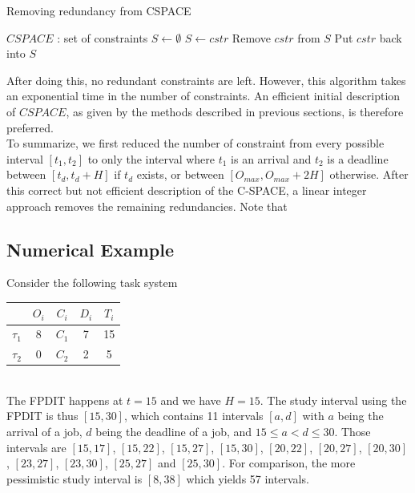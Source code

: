 \documentclass[times, 10pt,twocolumn, a4paper]{article}
\begin{document}
\begin{algorithm}
\caption{Removing redundancy from CSPACE}
\label{alg:prunRedun}
	\begin{algorithmic}[1]
		\STATE $CSPACE$ : set of constraints
		\STATE $S \leftarrow \emptyset$
		\STATE {}
				\STATE $S \leftarrow cstr$
			\ENDIF
		\ENDFOR
		\STATE {}
			\STATE Remove $cstr$ from $S$
				\STATE Put $cstr$ back into $S$
			\ENDIF
		\ENDFOR
	\end{algorithmic}
\end{algorithm}

After doing this, no redundant constraints are left. However, this algorithm takes an exponential time in the number of constraints. An efficient initial description of $CSPACE$, as given by the methods described in previous sections, is therefore preferred.\\

To summarize, we first reduced the number of constraint from every possible interval $[t_1, t_2]$ to only the interval where $t_1$ is an arrival and $t_2$ is a deadline between $[t_d, t_d + H]$ if $t_d$ exists, or between $[O_{max}, O_{max} + 2H]$ otherwise. After this correct but not efficient description of the C-SPACE, a linear integer approach removes the remaining redundancies. Note that

\subsection{Numerical Example}

Consider the following task system

		\begin{center}
		\begin{tabular}{|r|c|c|c|c|}
		 \hline
		  & $O_i$ & $C_i$ & $D_i$ & $T_i$ \\
		 \hline
		 $\tau_1$ & 8 & $C_1$ & 7 & 15\\
		 \hline
		 $\tau_2$ & 0 & $C_2$ & 2 & 5\\
		 \hline
		\end{tabular}
		\end{center}
		~\\

The FPDIT happens at $t=15$ and we have $H = 15$. The study interval using the FPDIT is thus $[15, 30]$, which contains 11 intervals $[a,d]$ with $a$ being the arrival of a job, $d$ being the deadline of a job, and $15 \leqslant a < d \leqslant 30$. Those intervals are
$[15, 17]$, $[15, 22]$, $[15, 27]$, $[15, 30]$, $[20, 22]$, $[20, 27]$, $[20, 30]$, $[23, 27]$, $[23, 30]$, $[25, 27]$ and $[25, 30]$. For comparison, the more pessimistic study interval is $[8, 38]$ which yields 57 intervals.\\
\end{document}
